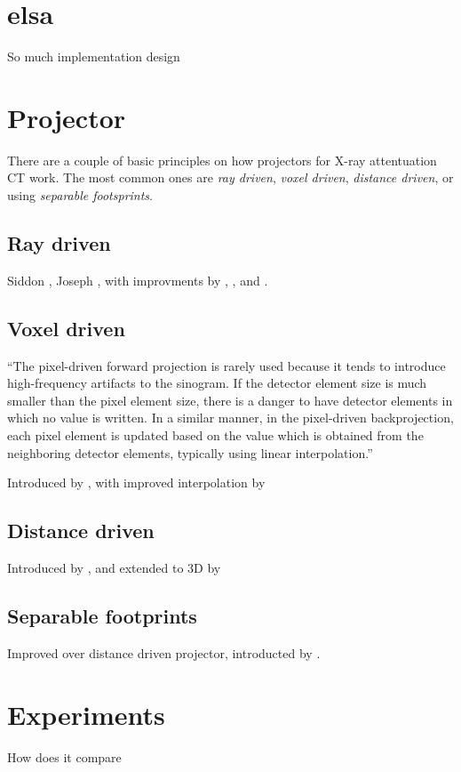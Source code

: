 \chapter{elsa}

So much implementation design

\chapter{Projector}

There are a couple of basic principles on how projectors for X-ray attentuation CT work.
The most common ones are \textit{ray driven}, \textit{voxel driven}, \textit{distance driven},
or using \textit{separable footsprints}.


\section{Ray driven}
 
Siddon \cite{siddon_fast_1985}, Joseph \cite{joseph_improved_1982}, with improvments
by \cite{jacobs_fast_1998}, \cite{christiaens_fast_1999}, \cite{zhao_fast_2004} and \cite{gao_fast_2012}.

\section{Voxel driven}

\enquote{The pixel-driven forward projection is rarely used because it tends to introduce
high-frequency artifacts to the sinogram. If the detector element size is much smaller than the
pixel element size, there is a danger to have detector elements in which no value is written. In a
similar manner, in the pixel-driven backprojection, each pixel element is updated based on the value
which is obtained from the neighboring detector elements, typically using linear interpolation.}
\cite{levakhina_three-dimensional_2014}

Introduced by \cite{peters_algorithms_1981}, with improved interpolation by \cite{harauz_interpolation_1983}

\section{Distance driven}
 
Introduced by \cite{de_man_distance-driven_2002}, and extended to 3D by \cite{de_man_distance-driven_2004}

\section{Separable footprints}

Improved over distance driven projector, introducted by \cite{long_3d_2010} \cite{long_3d_nodate}.

\chapter{Experiments}

How does it compare

